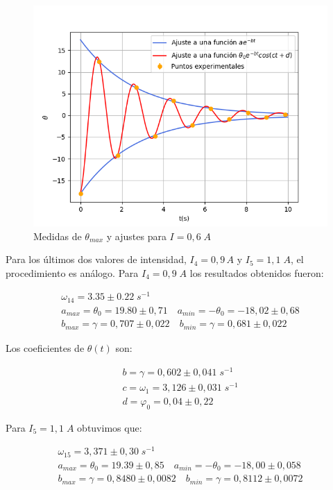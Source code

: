 \documentclass[a4paper,12pt,titlepage]{article}
\begin{document}
\begin{figure}[h!]
    \centering
    \includegraphics[width=0.65\linewidth]{Images/I6ajuste.png}
    \caption{Medidas de $\theta_{max}$ y ajustes para $I=0,6\;A$}
\end{figure}

\newpage

Para los últimos dos valores de intensidad, $I_4=0,9\,A$ y $I_5=1,1\;A$, el procedimiento es análogo. Para $I_4=0,9\;A$ los resultados obtenidos fueron:

\begin{equation}
    \begin{gathered}
        \omega_{14} =  3.35 \pm 0.22 \; s^{-1} \\
        a_{max} = \theta_0 = 19.80 \pm 0,71 \quad a_{min} = -\theta_0 = -18,02 \pm 0,68\\
        b_{max} = \gamma =0,707\pm 0,022 \quad b_{min} = \gamma = 0,681 \pm 0,022
    \end{gathered}
\end{equation}

Los coeficientes de $\theta(t)$ son:

\begin{equation}
    \begin{gathered}
        b = \gamma = 0,602\pm 0,041 \;s^{-1}\\
        c = \omega_1 = 3,126\pm 0,031 \; s^{-1}\\
        d = \varphi_0 = 0,04 \pm 0,22 
    \end{gathered}
\end{equation}

Para $I_5=1,1\;A$ obtuvimos que:

\begin{equation}
    \begin{gathered}
        \omega_{15} = 3,371 \pm 0,30 \; s^{-1} \\
        a_{max} = \theta_0 = 19.39 \pm 0,85 \quad a_{min} = -\theta_0 = -18,00 \pm 0,058\\
        b_{max} = \gamma =0,8480\pm 0,0082 \quad b_{min} = \gamma = 0,8112 \pm 0,0072
    \end{gathered}
\end{equation}
\end{document}
